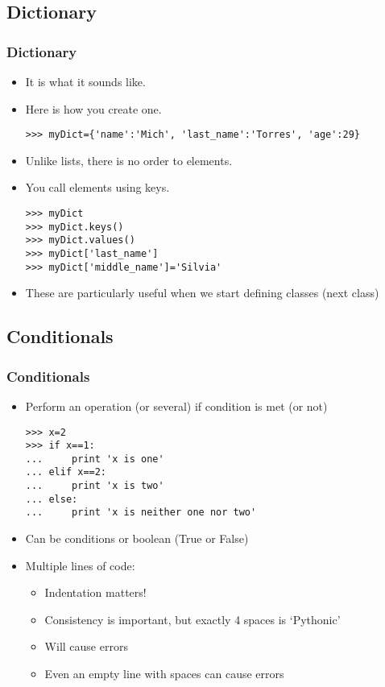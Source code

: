 \documentclass[xcolor=x11names,compress]{beamer}
\renewcommand{\(}{\begin{columns}}
\renewcommand{\)}{\end{columns}}
\newcommand{\<}[1]{\begin{column}{#1}}
\renewcommand{\>}{\end{column}}
\begin{document}
\subsection{Dictionary}
\begin{frame}[fragile]
  \frametitle{Dictionary}
  \begin{itemize}
  	\item It is what it sounds like. \pause
	\item Here is how you create one. \pause
\scriptsize
\begin{verbatim}
>>> myDict={'name':'Mich', 'last_name':'Torres', 'age':29}
\end{verbatim}
\normalsize
	\item Unlike lists, there is no order to elements. \pause
	\item You call elements using keys. \pause
\begin{verbatim}
>>> myDict
>>> myDict.keys()
>>> myDict.values()
>>> myDict['last_name']
>>> myDict['middle_name']='Silvia'
\end{verbatim}
\pause
\item These are particularly useful when we start defining classes (next class)
  \end{itemize}
\end{frame}

\subsection{Conditionals}
\begin{frame}[fragile]
\frametitle{Conditionals}
\begin{itemize}
\item Perform an operation (or several) if condition is met (or not) \pause
\begin{verbatim}
>>> x=2
>>> if x==1:
...     print 'x is one'
... elif x==2:
...     print 'x is two'
... else:
...     print 'x is neither one nor two'
\end{verbatim}
\pause
\item Can be conditions or boolean (True or False) \pause
\item Multiple lines of code: \pause
\begin{itemize}
\item Indentation matters! \pause
\item Consistency is important, but exactly 4 spaces is `Pythonic' \pause
\item Will cause errors \pause
\item Even an empty line with spaces can cause errors
\end{itemize}
\end{itemize}
\end{frame}
\end{document}

